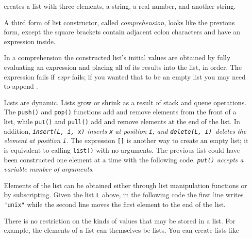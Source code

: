 
\noindent creates a list with three elements, a string, a real number,
and another string.

A third form of list constructor, called {\em comprehension\/}, looks
like the previous form, except the square brackets contain adjacent colon
characters and have an expression inside.


In a comprehension the constructed list's initial values are obtained
by fully evaluating an expression and placing all of its results into the
list, in order. The expression fails if {\em expr\/} fails; if you
wanted that to be an empty list you may need to append
\texttt{\textbar []}.

Lists are dynamic. Lists grow or shrink as a result
of stack and queue operations. The \texttt{push()} and
\texttt{pop()} functions add and remove elements from the
front of a list, while \texttt{put()} and
\texttt{pull()} add and remove elements at the end of
the list. In addition,
{\em {}\texttt{insert(L, i, x)} inserts
\texttt{x} at position \texttt{i}, and
\texttt{delete(L, i)}\texttt{ }deletes the element
at position \texttt{i}.\/}
The expression \texttt{[]} is another
way to create an empty list; it is equivalent to
calling \texttt{list()} with no arguments.
The previous list could have been constructed one element at
a time with the following code.
{\em \texttt{put()} accepts a variable number of arguments\/}.


Elements of the list can be obtained either through list manipulation
functions or by subscripting. Given the list \texttt{L} above, in the
following code the first line writes
\texttt{"unix"} while the second line moves
the first element to the end of the list.


There is no restriction on the kinds of values that may be stored in a
list. For example, the elements of a list can themselves be lists. You
can create lists like


